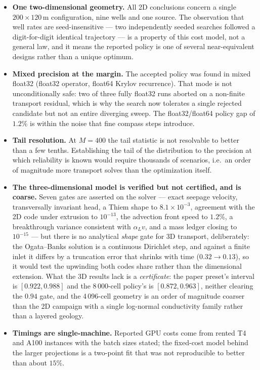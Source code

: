 \begin{itemize}
  \item \textbf{One two-dimensional geometry.} All 2D conclusions concern a single
        $200\times120$\,m configuration, nine wells and one source. The
        observation that well rates are seed-insensitive --- two independently
        seeded searches followed a digit-for-digit identical trajectory --- is a
        property of this cost model, not a general law, and it means the reported
        policy is one of several near-equivalent designs rather than a unique
        optimum.
  \item \textbf{Mixed precision at the margin.} The accepted policy was found in
        mixed float32 (float32 operator, float64 Krylov recurrence). That mode is
        not unconditionally safe: two of three fully float32 runs aborted on a
        non-finite transport residual, which is why the search now tolerates a
        single rejected candidate but not an entire diverging sweep. The
        float32/float64 policy gap of $1.2\%$ is within the noise that fine
        compass steps introduce.
  \item \textbf{Tail resolution.} At $M=400$ the tail statistic is not resolvable
        to better than a few tenths. Establishing the tail of the distribution to
        the precision at which reliability is known would require thousands of
        scenarios, i.e.\ an order of magnitude more transport solves than the
        optimization itself.
  \item \textbf{The three-dimensional model is verified but not certified, and
        is coarse.} Seven gates are asserted on the solver --- exact seepage
        velocity, transversally invariant head, a Thiem shape to $8.1\times
        10^{-3}$, agreement with the 2D code under extrusion to $10^{-13}$, the
        advection front speed to $1.2\%$, a breakthrough variance consistent
        with $\alpha_L v$, and a mass ledger closing to $10^{-15}$ --- but there is
        no analytical \emph{shape} gate for 3D transport, deliberately: the
        Ogata--Banks solution is a continuous Dirichlet step, and against a finite
        inlet it differs by a truncation error that shrinks with time ($0.32\to
        0.13$), so it would test the upwinding both codes share rather than the
        dimensional extension. What the 3D results lack is a \emph{certificate}:
        the paper preset's interval is $[0.922,0.988]$ and the $8\,000$-cell
        policy's is $[0.872,0.963]$, neither clearing the $0.94$ gate, and the
        4\,096-cell geometry is an order of magnitude coarser than the 2D
        campaign with a single log-normal conductivity family rather than a
        layered geology.
  \item \textbf{Timings are single-machine.} Reported GPU costs come from rented
        T4 and A100 instances with the batch sizes stated; the fixed-cost model
        behind the larger projections is a two-point fit that was not
        reproducible to better than about $15\%$.
\end{itemize}

